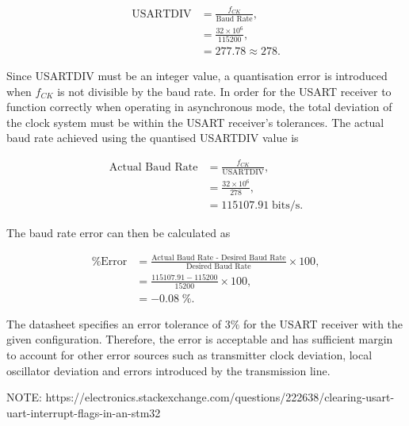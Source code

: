 \begin{align}
	\text{USARTDIV}&=\frac{f_{CK}}{\text{Baud Rate}},\\
	&=\frac{32\times10^6}{115200},\\
	&=277.78\approx278.
\end{align} 
	
Since USARTDIV must be an integer value, a quantisation error is introduced when $f_{CK}$ is not divisible by
the baud rate. In order for the \ac{USART} receiver to function correctly when operating in asynchronous mode, the total deviation of the clock system must be within the \ac{USART} receiver's tolerances. The actual baud rate achieved using the quantised USARTDIV value is 

\begin{align}
	\text{Actual Baud Rate}&=\frac{f_{CK}}{\text{USARTDIV}},\\
	&=\frac{32\times10^6}{278},\\
	&=115107.91\;\text{bits/s}.
\end{align}

The baud rate error can then be calculated as

\begin{align}
	\text{\% Error}&=\frac{\text{Actual Baud Rate - Desired Baud Rate}}{\text{Desired Baud Rate}} \times 100,\\
	&=\frac{115107.91-115200}{15200} \times 100,\\
	&=-0.08\;\text{\%}.
\end{align}

The datasheet specifies an error tolerance of $3\%$ for the \ac{USART} receiver with the given configuration. Therefore, the error is acceptable and has sufficient margin to account for other error sources such as transmitter clock deviation, local oscillator deviation and errors introduced by the transmission line.

NOTE: https://electronics.stackexchange.com/questions/222638/clearing-usart-uart-interrupt-flags-in-an-stm32

